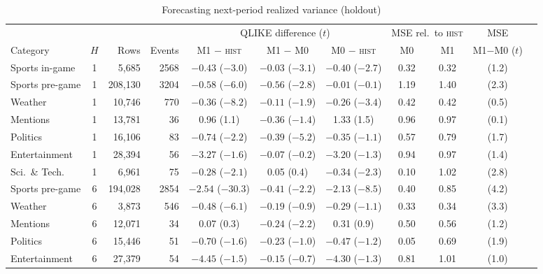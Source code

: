 \begin{table}[t]
\centering
\begin{threeparttable}
\caption{Forecasting next-period realized variance (holdout)}\label{tab:dyn-forecast}
\footnotesize
\setlength{\tabcolsep}{3pt}
\begin{tabular}{lcrrccccccc}
\toprule
 & & & & \multicolumn{3}{c}{QLIKE difference ($t$)} & \multicolumn{2}{c}{MSE rel.\ to \textsc{hist}} & MSE \\
\cmidrule(lr){5-7}\cmidrule(lr){8-9}
Category & $H$ & Rows & Events & M1 $-$ \textsc{hist} & M1 $-$ M0 & M0 $-$ \textsc{hist} & M0 & M1 & M1$-$M0 ($t$) \\
\midrule
Sports in-game & 1 & 5{,}685 & 2568 & $-0.43$ ($-3.0$) & $-0.03$ ($-3.1$) & $-0.40$ ($-2.7$) & 0.32 & 0.32 & (1.2) \\
Sports pre-game & 1 & 208{,}130 & 3204 & $-0.58$ ($-6.0$) & $-0.56$ ($-2.8$) & $-0.01$ ($-0.1$) & 1.19 & 1.40 & (2.3) \\
Weather & 1 & 10{,}746 & 770 & $-0.36$ ($-8.2$) & $-0.11$ ($-1.9$) & $-0.26$ ($-3.4$) & 0.42 & 0.42 & (0.5) \\
Mentions & 1 & 13{,}781 & 36 & 0.96 (1.1) & $-0.36$ ($-1.4$) & 1.33 (1.5) & 0.96 & 0.97 & (0.1) \\
Politics & 1 & 16{,}106 & 83 & $-0.74$ ($-2.2$) & $-0.39$ ($-5.2$) & $-0.35$ ($-1.1$) & 0.57 & 0.79 & (1.7) \\
Entertainment & 1 & 28{,}394 & 56 & $-3.27$ ($-1.6$) & $-0.07$ ($-0.2$) & $-3.20$ ($-1.3$) & 0.94 & 0.97 & (1.4) \\
Sci.\ \& Tech. & 1 & 6{,}961 & 75 & $-0.28$ ($-2.1$) & 0.05 (0.4) & $-0.34$ ($-2.3$) & 0.10 & 1.02 & (2.8) \\
\addlinespace
Sports pre-game & 6 & 194{,}028 & 2854 & $-2.54$ ($-30.3$) & $-0.41$ ($-2.2$) & $-2.13$ ($-8.5$) & 0.40 & 0.85 & (4.2) \\
Weather & 6 & 3{,}873 & 546 & $-0.48$ ($-6.1$) & $-0.19$ ($-0.9$) & $-0.29$ ($-1.1$) & 0.33 & 0.34 & (3.3) \\
Mentions & 6 & 12{,}071 & 34 & 0.07 (0.3) & $-0.24$ ($-2.2$) & 0.31 (0.9) & 0.50 & 0.56 & (1.2) \\
Politics & 6 & 15{,}446 & 51 & $-0.70$ ($-1.6$) & $-0.23$ ($-1.0$) & $-0.47$ ($-1.2$) & 0.05 & 0.69 & (1.9) \\
Entertainment & 6 & 27{,}379 & 54 & $-4.45$ ($-1.5$) & $-0.15$ ($-0.7$) & $-4.30$ ($-1.3$) & 0.81 & 1.01 & (1.0) \\

\end{tabular}
\end{threeparttable}
\end{table}
